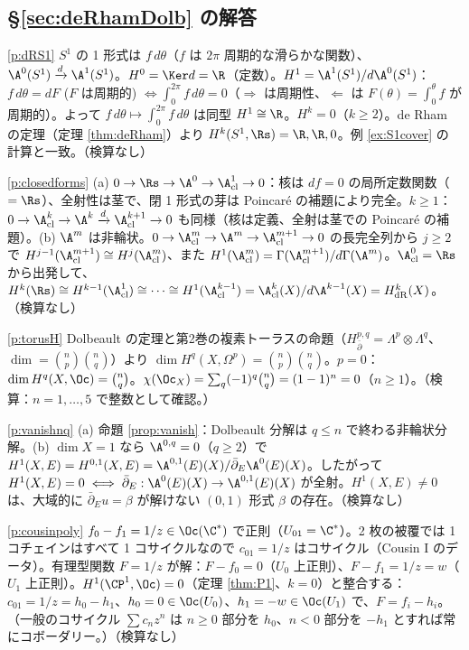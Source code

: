 \subsection*{§\ref{sec:deRhamDolb} の解答}
\begin{sol}{\ref{p:dRS1}}
$S^1$ の 1 形式は $f\,d\theta$（$f$ は $2\pi$ 周期的な滑らかな関数）、$\A^0(S^1)\xrightarrow{d}\A^1(S^1)$。$H^0=\Ker d=\R$（定数）。$H^1=\A^1(S^1)/d\A^0(S^1)$：$f\,d\theta=dF$ ($F$ は周期的) $\iff\int_0^{2\pi}f\,d\theta=0$（$\Rightarrow$ は周期性、$\Leftarrow$ は $F(\theta)=\int_0^\theta f$ が周期的）。よって $f\,d\theta\mapsto\int_0^{2\pi}f\,d\theta$ は同型 $H^1\cong\R$。$H^k=0$（$k\ge2$）。de Rham の定理（定理 \ref{thm:deRham}）より $H^k(S^1,\Rs)=\R,\R,0$。例 \ref{ex:S1cover} の \Cech{} 計算と一致。（検算なし）
\end{sol}
\begin{sol}{\ref{p:closedforms}}
(a) $0\to\Rs\to\A^0\to\A^1_{\mathrm{cl}}\to0$：核は $df=0$ の局所定数関数（$=\Rs$）、全射性は茎で、閉 1 形式の芽は Poincar\'e の補題により完全。$k\ge1$：$0\to\A^k_{\mathrm{cl}}\to\A^k\xrightarrow{d}\A^{k+1}_{\mathrm{cl}}\to0$ も同様（核は定義、全射は茎での Poincar\'e の補題）。(b) $\A^m$ は非輪状。$0\to\A^m_{\mathrm{cl}}\to\A^m\to\A^{m+1}_{\mathrm{cl}}\to0$ の長完全列から $j\ge2$ で $H^{j-1}(\A^{m+1}_{\mathrm{cl}})\cong H^j(\A^m_{\mathrm{cl}})$、また $H^1(\A^m_{\mathrm{cl}})=\Gamma(\A^{m+1}_{\mathrm{cl}})/d\Gamma(\A^m)$。$\A^0_{\mathrm{cl}}=\Rs$ から出発して、$H^k(\Rs)\cong H^{k-1}(\A^1_{\mathrm{cl}})\cong\cdots\cong H^1(\A^{k-1}_{\mathrm{cl}})=\A^k_{\mathrm{cl}}(X)/d\A^{k-1}(X)=H^k_{\mathrm{dR}}(X)$。（検算なし）
\end{sol}
\begin{sol}{\ref{p:torusH}}
Dolbeault の定理と第2巻の複素トーラスの命題（$H^{p,q}_{\bar\partial}=\Lambda^p\otimes\Lambda^q$、$\dim=\binom np\binom nq$）より $\dim H^q(X,\Omega^p)=\binom np\binom nq$。$p=0$：$\dim H^q(X,\Oc)=\binom nq$。$\chi(\Oc_X)=\sum_q(-1)^q\binom nq=(1-1)^n=0$（$n\ge1$）。（検算：$n=1,\dots,5$ で整数として確認。）
\end{sol}
\begin{sol}{\ref{p:vanishnq}}
(a) 命題 \ref{prop:vanish}：Dolbeault 分解は $q\le n$ で終わる非輪状分解。(b) $\dim X=1$ なら $\A^{0,q}=0$（$q\ge2$）で $H^1(X,E)=H^{0,1}(X,E)=\A^{0,1}(E)(X)/\bar\partial_E\A^0(E)(X)$。したがって $H^1(X,E)=0\iff\bar\partial_E:\A^0(E)(X)\to\A^{0,1}(E)(X)$ が全射。$H^1(X,E)\ne0$ は、大域的に $\bar\partial_Eu=\beta$ が解けない $(0,1)$ 形式 $\beta$ の存在。（検算なし）
\end{sol}
\begin{sol}{\ref{p:cousinpoly}}
$f_0-f_1=1/z\in\Oc(\C^*)$ で正則（$U_{01}=\C^*$）。2 枚の被覆では 1 コチェインはすべて 1 コサイクルなので $c_{01}=1/z$ はコサイクル（Cousin I のデータ）。有理型関数 $F=1/z$ が解：$F-f_0=0$（$U_0$ 上正則）、$F-f_1=1/z=w$（$U_1$ 上正則）。$H^1(\CP^1,\Oc)=0$（定理 \ref{thm:P1}、$k=0$）と整合する：$c_{01}=1/z=h_0-h_1$、$h_0=0\in\Oc(U_0)$、$h_1=-w\in\Oc(U_1)$ で、$F=f_i-h_i$。（一般のコサイクル $\sum c_nz^n$ は $n\ge0$ 部分を $h_0$、$n<0$ 部分を $-h_1$ とすれば常にコボーダリー。）（検算なし）
\end{sol}

